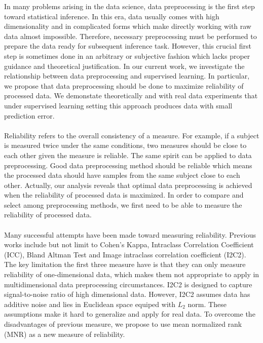 \documentclass[11pt,journal,compsoc]{IEEEtran}
\begin{document}
In many problems arising in the data science, data preprocessing is the first step toward statistical inference. In this era, data usually comes with high dimensionality and in complicated forms which make directly working with raw data almost impossible. Therefore, necessary preprocessing must be performed to prepare the data ready for subsequent inference task. However, this crucial first step is sometimes done in an arbitrary or subjective fashion which lacks proper guidance and theoretical justification. In our current work, we investigate the relationship between data preprocessing and supervised learning. In particular, we propose that data preprocessing should be done to maximize reliability of processed data. We demonstate theoretically and with real data experiments that under supervised learning setting this approach produces data with small prediction error.\\
\\
Reliability refers to the overall consistency of a measure. For example, if a subject is measured twice under the same conditions, two measures should be close to each other given the measure is reliable. The same spirit can be applied to data preprocessing. Good data preprocessing method should be reliable which means the processed data should have samples from the same subject close to each other. Actually, our analysis reveals that optimal data preprocessing is achieved when the reliability of processed data is maximized. In order to compare and select among preprocessing methods, we first need to be able to measure the reliability of processed data. \\
\\
Many successful attempts have been made toward measuring reliability. Previous works include but not limit to Cohen's Kappa, Intraclass Correlation Coefficient (ICC), Bland Altman Test and Image intraclass correlation coefficient (I2C2). The key limitation the first three measure have is that they can only measure reliability of one-dimensional data, which makes them not appropriate to apply in multidimensional data preprocessing circumstances. I2C2 is designed to capture signal-to-noise ratio of high dimensional data. However, I2C2 assumes data has additive noise and lies in Euclidean space equiped with $L_2$ norm. These assumptions make it hard to generalize and apply for real data. To overcome the disadvantages of previous measure, we propose to use mean normalized rank (MNR) as a new measure of reliability. \\
\\
\end{document}
